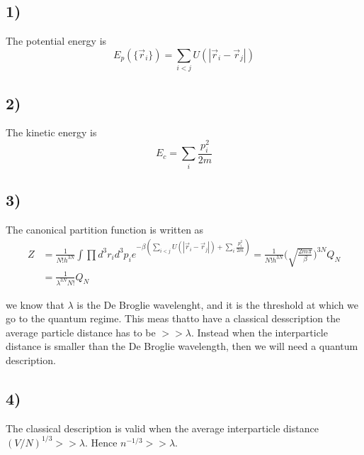 \documentclass[10pt,a4paper]{book}
\begin{document}
\subsection*{1)}
The potential energy is
$$E_p(\{\vec{r}_i\})=\sum_{i<j}U(|\vec{r}_i-\vec{r}_j|)$$
\subsection*{2)}
The kinetic energy is 
$$E_c=\sum_i \frac{p_i^2}{2m}$$

\subsection*{3)}
The canonical partition function is written as
\begin{align*}
Z&=\frac{1}{N!h^{3N}}\int \prod d^3r_id^3p_i e^{-\beta(\sum_{i<j}U(|\vec{r}_i-\vec{r}_j|)+\sum_i \frac{p_i^2}{2m})}=\frac{1}{N!h^{3N}}\bigg(\sqrt{\frac{2m\pi}{\beta}}\bigg)^{3N}Q_N\\
&=\frac{1}{\lambda^{3N}N!}Q_N
\end{align*}

we know that $\lambda$ is the De Broglie wavelenght, and it is the threshold at which we go to the quantum regime. This meas thatto have a classical desscription the average particle distance has to be $>>\lambda$. Instead when the interparticle distance is smaller than the De Broglie wavelength, then we will need a quantum description.


\subsection*{4)}
The classical description is valid when the average interparticle distance $(V/N)^{1/3}>>\lambda$. Hence $n^{-1/3}>>\lambda$. 
\end{document}
